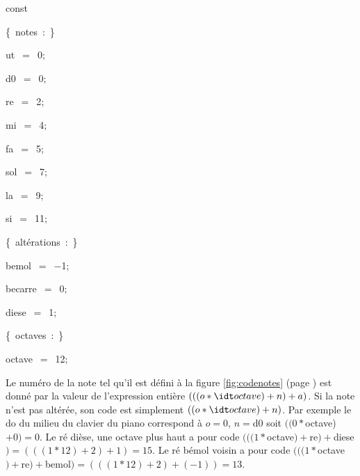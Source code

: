 {
\parindent {}
\medskip

\pagebreak[3] 
\vspace{\neglskip}\mbox{\blc  \idt  \mcl const\idt }\par 
\vspace{\neglskip}\mbox{\blc  \blk\idt  \cmt  \{\ notes\ :\ \}\idt }\par 
\vspace{\neglskip}\mbox{\blc  \blk\blk\idt  ut\ $=$\ 0$;$}\par 
\vspace{\neglskip}\mbox{\blc  \blk\blk\idt  d0\ $=$\ 0$;$}\par
\vspace{\neglskip}\mbox{\blc  \blk\blk\idt  re\ $=$\ 2$;$}\par 
\vspace{\neglskip}\mbox{\blc  \blk\blk\idt  mi\ $=$\ 4$;$}\par 
\vspace{\neglskip}\mbox{\blc  \blk\blk\idt  fa\ $=$\ 5$;$}\par 
\vspace{\neglskip}\mbox{\blc  \blk\blk\idt  sol\ $=$\ 7$;$}\par 
\vspace{\neglskip}\mbox{\blc  \blk\blk\idt  la\ $=$\ 9$;$}\par 
\vspace{\neglskip}\mbox{\blc  \blk\blk\idt  si\ $=$\ 11$;$}\par 
\vspace{\neglskip}\mbox{\blc  \blk\blk\idt  \cmt  \{\ altérations\ :\ \}\idt }\par 
\vspace{\neglskip}\mbox{\blc  \blk\blk\idt  bemol\ $=$\ $-$1$;$}\par 
\vspace{\neglskip}\mbox{\blc  \blk\blk\idt  becarre\ $=$\ 0$;$}\par 
\vspace{\neglskip}\mbox{\blc  \blk\blk\idt  diese\ $=$\ 1$;$}\par 
\vspace{\neglskip}\mbox{\blc  \blk\blk\idt  \cmt  \{\ octaves\ :\ \}\idt }\par 
\vspace{\neglskip}\mbox{\blc  \blk\blk\idt  octave\ $=$\ 12$;$}\par 

\medskip }

\noindent Le numéro de la note tel qu'il est  défini à la figure \ref{fig:codenotes} 
(page \pageref{fig:codenotes}) est donné par la valeur de l'expression entière 
$(((o \ast {\idt octave}) + n) + a)$. Si la note n'est pas altérée, son code est simplement
$((o \ast {\idt octave}) + n)$. Par exemple le do du milieu du clavier du piano correspond à 
$o = 0$, $n = ${\idt d0} soit $((0 \ast ${\idt octave})$ + 0) = 0$. Le ré dièse, une octave plus haut
a pour code $(((1 \ast ${\idt octave}$) + ${\idt re}$) + ${\idt diese}$)
= (((1 \ast 12) + 2) + 1) = 15$. Le ré bémol voisin
a pour code $(((1 \ast ${\idt octave}$) + ${\idt re}$) + ${\idt bemol}$)
= (((1 \ast 12) + 2) + (-1)) = 13$.

